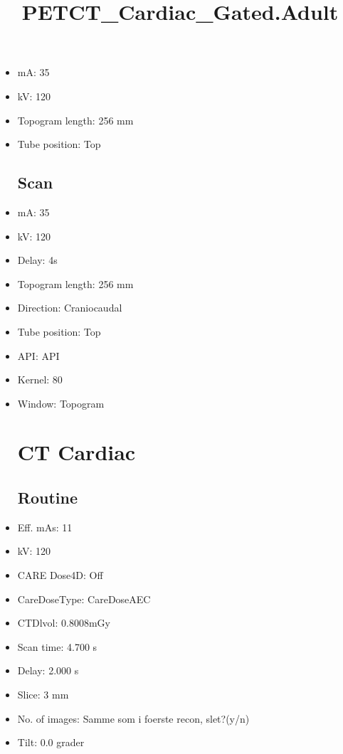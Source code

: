 \documentclass[12pt]{article}
\title{PETCT\_Cardiac\_Gated.Adult}
\begin{document}
\maketitle
\newpage
\tableofcontents
\newpage
{}


\begin{itemize}\section{Topogram}
\subsection{Routine}
\item mA: 35\item kV: 120\item Topogram length: 256 mm\item Tube position: Top
\subsection{Scan}\item mA: 35\item kV: 120\item Delay: 4s\item Topogram length: 256 mm\item Direction: Craniocaudal\item Tube position: Top\item API: API \item Kernel: 80\item Window: Topogram
\section{CT Cardiac}
\subsection{Routine}
\item Eff. mAs: 11\item kV: 120\item CARE Dose4D: Off\item CareDoseType: CareDoseAEC\item CTDlvol: 0.8008mGy\item Scan time: 4.700 s\item Delay: 2.000 s\item Slice: 3 mm\item No. of images: Samme som i foerste recon, slet?(y/n)\item Tilt: 0.0 grader

\end{itemize}
\end{document}
